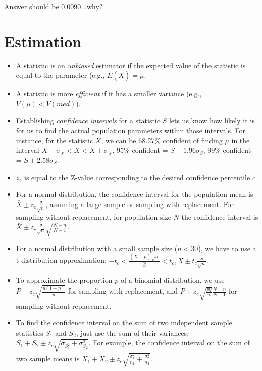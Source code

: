 \documentclass[11pt,letterpaper]{scrartcl}
\begin{document}
{\color{red} Answer should be 0.0090...why?}

\section{Estimation}

\begin{itemize}
\item A statistic is an \emph{unbiased} estimator if the expected value of the statistic is equal to the parameter (e.g., $E(\bar{X}) = \mu$. 
\item A statistic is more \emph{efficient} if it has a smaller variance (e.g., $V(\mu) < V(med)$).
\item Establishing \emph{confidence intervals} for a statistic $S$ lets us know how likely it is for us to find the actual population parameters within those intervals. 
For instance, for the statistic $\bar{X}$, we can be 68.27\% confident of finding $\mu$ in the interval $\bar{X} - \sigma_{\bar{X}} < \bar{X} < \bar{X} + \sigma_{\bar{X}}$. 
95\% confident = $S \pm 1.96\sigma_{S}$, 99\% confident = $S \pm 2.58\sigma_{S}$. 
\item $z_{c}$ is equal to the Z-value corresponding to the desired confidence percentile $c$
\item For a normal distribution, the confidence interval for the population mean is $\bar{X} \pm z_{c}\frac{\sigma}{\sqrt{n}}$, assuming a large sample or sampling with replacement.
For sampling without replacement, for population size $N$ the confidence interval is $\bar{X} \pm z_{c}\frac{\sigma}{\sqrt{n}}\sqrt{\frac{N - n}{N - 1}}$.
\item For a normal distribution with a small sample size ($n < 30$), we have to use a t-distribution approximation: 
$-t_{c} < \frac{(\bar{X}-\mu)\sqrt{n}}{\hat{S}} < t_{c}, \bar{X} \pm t_{c}\frac{\hat{S}}{\sqrt{n}}$. 
\item To approximate the proportion $p$ of a binomial distribution, we use $P \pm z_{c}\sqrt{\frac{p(1-p)}{n}}$ for sampling with replacement, and $P \pm z_{c}\sqrt{\frac{pq}{n}}\frac{N-n}{N-1}$ for sampling without replacement.
\item To find the confidence interval on the sum of two independent sample statistics $S_{1}$ and $S_{2}$, just use the sum of their variances: $S_{1} + S_{2} \pm z_{c}\sqrt{\sigma_{S_{1}^{2}} + \sigma_{S_{2}}^{2}}$. 
For example, the confidence interval on the sum of two sample means is $\bar{X}_{1} + \bar{X}_{2} \pm z_{c}\sqrt{\frac{\sigma_{1}^{2}}{n_{1}} + \frac{\sigma_{2}^{2}}{n_{2}}}$.

\end{itemize}
\end{document}
